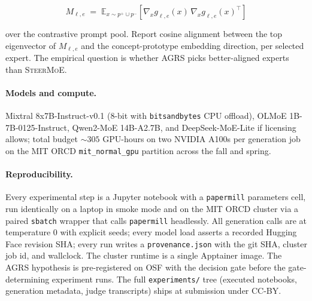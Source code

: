 \documentclass[11pt]{article}
\begin{document}
\[
M_{\ell, e}
\;=\;
\mathbb{E}_{x \sim p^+ \cup p^-}\!\left[
  \nabla_x g_{\ell, e}(x)\, \nabla_x g_{\ell, e}(x)^\top
\right]
\]

over the contrastive prompt pool. Report cosine alignment between
the top eigenvector of $M_{\ell, e}$ and the concept-prototype
embedding direction, per selected expert. The empirical question
is whether AGRS picks better-aligned experts than \textsc{SteerMoE}.

\paragraph{Models and compute.}
Mixtral 8x7B-Instruct-v0.1 ($8$-bit with \texttt{bitsandbytes}
CPU offload), OLMoE 1B-7B-0125-Instruct, Qwen2-MoE 14B-A2.7B, and
DeepSeek-MoE-Lite if licensing allows; total budget
$\sim 305$ GPU-hours on two NVIDIA A100s per generation job on
the MIT ORCD \texttt{mit\_normal\_gpu} partition across the
fall and spring.

\paragraph{Reproducibility.}
Every experimental step is a Jupyter notebook with a
\texttt{papermill} parameters cell, run identically on a laptop in
smoke mode and on the MIT ORCD cluster via a paired
\texttt{sbatch} wrapper that calls \texttt{papermill} headlessly.
All generation calls are at temperature $0$ with explicit seeds;
every model load asserts a recorded Hugging Face revision SHA;
every run writes a \texttt{provenance.json} with the git SHA,
cluster job id, and wallclock. The cluster runtime is a single
Apptainer image. The AGRS hypothesis is pre-registered on OSF
with the decision gate before the gate-determining experiment
runs. The full \texttt{experiments/} tree (executed notebooks,
generation metadata, judge transcripts) ships at submission
under CC-BY.
\end{document}
